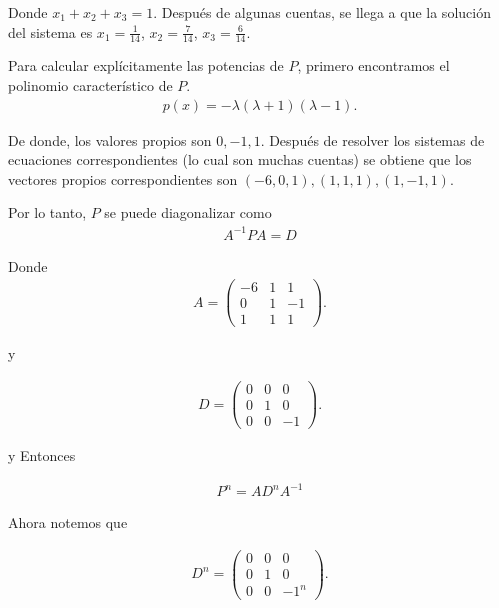 Donde $x_1 + x_2 + x_3 = 1$. Después de algunas cuentas, se llega a que la solución del sistema es
$x_1 = \frac{1}{14}$, $x_2 = \frac{7}{14}$, $x_3 = \frac{6}{14}$.\pn

Para calcular explícitamente las potencias de $P$, primero encontramos el polinomio característico de $P$.
\begin{align}
        p(x)    =   -\lambda(\lambda + 1)(\lambda - 1).
\end{align}

De donde, los valores propios son $0, -1, 1$. Después de resolver los sistemas de ecuaciones correspondientes 
(lo cual son muchas cuentas) se obtiene que los vectores propios correspondientes son $(-6, 0 ,1), (1, 1, 1), (1, -1, 1)$.

Por lo tanto, $P$ se puede diagonalizar como
\begin{align}
    A^{-1} P A  = D
\end{align}

Donde 
\begin{align}
     A  =
        \begin{pmatrix}
            -6  &   1   &   1      \\
            0   &   1   &   -1     \\
            1   &   1   &   1
        \end{pmatrix}.   
\end{align}\pn

y 


\begin{align}
     D  =
        \begin{pmatrix}
            0   &   0   &   0      \\
            0   &   1   &   0      \\
            0   &   0   &   -1
        \end{pmatrix}.   
\end{align}\pn

y Entonces

\begin{align}
        P^n = A D^n A^{-1}
\end{align}

Ahora notemos que 

\begin{align}
     D^n  =
            \begin{pmatrix}
                0   &   0   &   0      \\
                0   &   1   &   0      \\
                0   &   0   &   -1^n
            \end{pmatrix}.   
\end{align}\pn

